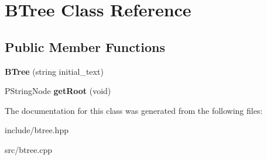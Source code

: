 \hypertarget{classBTree}{}\section{B\+Tree Class Reference}
\label{classBTree}
\subsection*{Public Member Functions}
\begin{DoxyCompactItemize}
\item 
{\bfseries B\+Tree} (string initial\+\_\+text)\hypertarget{classBTree_a3278f51f6a7719e17b2e2b17be41f324}{}\label{classBTree_a3278f51f6a7719e17b2e2b17be41f324}

\item 
P\+String\+Node {\bfseries get\+Root} (void)\hypertarget{classBTree_ada02034e08407da08fc3715ca84aeed4}{}\label{classBTree_ada02034e08407da08fc3715ca84aeed4}

\end{DoxyCompactItemize}


The documentation for this class was generated from the following files\+:\begin{DoxyCompactItemize}
\item 
include/btree.\+hpp\item 
src/btree.\+cpp\end{DoxyCompactItemize}
